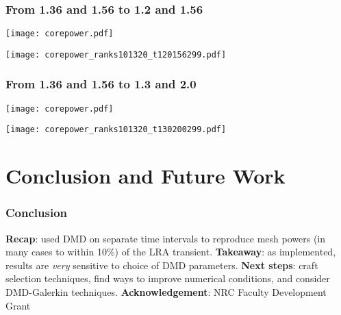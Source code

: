 \documentclass[fleqn]{beamer}
\begin{document}
 

\begin{frame}
\frametitle{From 1.36 and 1.56 to 1.2 and 1.56 }

\texttt{[image: corepower.pdf]}

\texttt{[image: corepower\_ranks101320\_t120156299.pdf]}

\end{frame}



\begin{frame}
\frametitle{From 1.36 and 1.56 to 1.3 and 2.0 }

\texttt{[image: corepower.pdf]}

\texttt{[image: corepower\_ranks101320\_t130200299.pdf]}

\end{frame}

\section{Conclusion and Future Work}

\begin{frame}

   \frametitle{Conclusion}
   
   {\bf Recap}: used DMD on separate time intervals to reproduce mesh powers (in many cases to within 10\%) of the LRA transient. 
   \vfill 
   \pause
   {\bf Takeaway}: as implemented, results are {\it very} sensitive to choice of DMD parameters.
   \vfill
   \pause 
   {\bf Next steps}: craft selection techniques, find ways to improve numerical conditions, and consider DMD-Galerkin techniques.
   \vfill 
   \pause
   {\bf Acknowledgement}: NRC Faculty Development Grant
   \vfill
 \end{frame}
\end{document}
